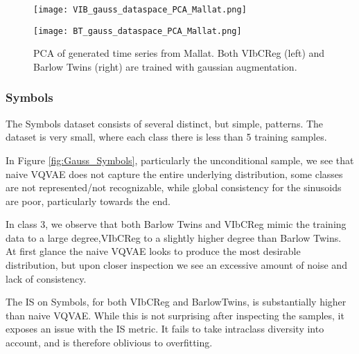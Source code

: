 \documentclass[../../thesis.tex]{subfiles}
\begin{document}
\begin{figure}[H]
    \centering
    \begin{minipage}[b]{0.40\textwidth}
        \centering
        \texttt{[image: VIB\_gauss\_dataspace\_PCA\_Mallat.png]}
    \end{minipage}
    \begin{minipage}[b]{0.40\textwidth}
        \centering
        \texttt{[image: BT\_gauss\_dataspace\_PCA\_Mallat.png]}
    \end{minipage}
    \caption{PCA of generated time series from Mallat. Both VIbCReg (left) and Barlow Twins (right) are trained with gaussian augmentation.}
    \label{fig:Mallat_data_PCA}
\end{figure}




\subsubsection{Symbols}

The Symbols dataset consists of several distinct, but simple, patterns. The dataset is very small, where each class there is less than 5 training samples.\newline

In Figure \ref{fig:Gauss_Symbols}, particularly the unconditional sample, we see that naive VQVAE does not capture the entire underlying distribution, some classes are not represented/not recognizable, while global consistency for the sinusoids are poor, particularly towards the end.\newline

In class 3, we observe that both Barlow Twins and VIbCReg mimic the training data to a large degree,VIbCReg to a slightly higher degree than Barlow Twins. At first glance the naive VQVAE looks to produce the most desirable distribution, but upon closer inspection we see an excessive amount of noise and lack of consistency.\newline

The IS on Symbols, for both VIbCReg and BarlowTwins, is substantially higher than naive VQVAE. While this is not surprising after inspecting the samples, it exposes an issue with the IS metric. It fails to take intraclass diversity into account, and is therefore oblivious to overfitting. \newline
\end{document}
